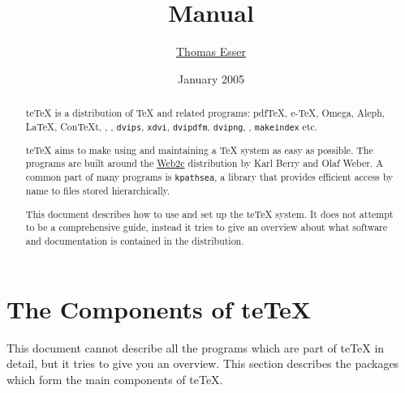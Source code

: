 \documentclass[11pt,a4paper]{article}
\title{\teTeX{} Manual}
\author{\href{mailto:te@dbs.uni-hannover.de}{Thomas Esser}}
\date{January 2005}
\newcommand{\teTeX}{\textrm{te}\TeX\xspace}
\begin{document}
\maketitle

\begin{abstract}
  
  \teTeX{} is a distribution of \TeX{} and related programs: pdf\TeX,
  e-\TeX, Omega, Aleph, \LaTeX, Con\TeX{}t, \MF, \MP{}, \texttt{dvips},
  \texttt{xdvi}, \texttt{dvipdfm}, \texttt{dvipng}, \BibTeX{},
  \texttt{makeindex} etc.

  \teTeX{} aims to make using and maintaining a \TeX{}
  system as easy as possible. The programs are built around the
  \href{http://tug.org/web2c/}{Web2c} distribution by Karl Berry and Olaf
  Weber. A common part of many programs is \texttt{kpathsea}, a library
  that provides efficient access by name to files stored hierarchically.

  This document describes how to use and set up the \teTeX{} system.
  It does not attempt to be a comprehensive guide, instead it tries to
  give an overview about what software and documentation is contained
  in the distribution.
\end{abstract}

\newpage
\tableofcontents

\newpage

\section{The Components of \teTeX}\label{sec:components}

This document cannot describe all the programs which are part of
\teTeX{} in detail, but it tries to give you an overview. This section
describes the packages which form the main components of \teTeX{}.
\end{document}
